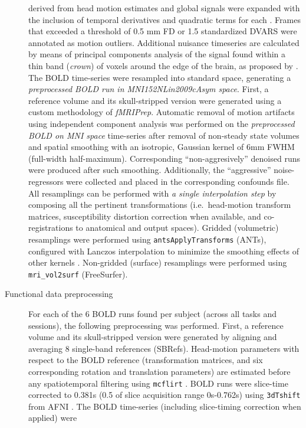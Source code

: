 \documentclass[
]{article}
\begin{document}
\begin{description}
derived from head motion estimates and global signals were expanded with
the inclusion of temporal derivatives and quadratic terms for each
\citep{confounds_satterthwaite_2013}. Frames that exceeded a threshold
of 0.5 mm FD or 1.5 standardized DVARS were annotated as motion
outliers. Additional nuisance timeseries are calculated by means of
principal components analysis of the signal found within a thin band
(\emph{crown}) of voxels around the edge of the brain, as proposed by
\citep{patriat_improved_2017}. The BOLD time-series were resampled into
standard space, generating a \emph{preprocessed BOLD run in
MNI152NLin2009cAsym space}. First, a reference volume and its
skull-stripped version were generated using a custom methodology of
\emph{fMRIPrep}. Automatic removal of motion artifacts using independent
component analysis \citep[ICA-AROMA,][]{aroma} was performed on the
\emph{preprocessed BOLD on MNI space} time-series after removal of
non-steady state volumes and spatial smoothing with an isotropic,
Gaussian kernel of 6mm FWHM (full-width half-maximum). Corresponding
``non-aggresively'' denoised runs were produced after such smoothing.
Additionally, the ``aggressive'' noise-regressors were collected and
placed in the corresponding confounds file. All resamplings can be
performed with \emph{a single interpolation step} by composing all the
pertinent transformations (i.e.~head-motion transform matrices,
susceptibility distortion correction when available, and
co-registrations to anatomical and output spaces). Gridded (volumetric)
resamplings were performed using \texttt{antsApplyTransforms} (ANTs),
configured with Lanczos interpolation to minimize the smoothing effects
of other kernels \citep{lanczos}. Non-gridded (surface) resamplings were
performed using \texttt{mri\_vol2surf} (FreeSurfer).
\item[Functional data preprocessing]
For each of the 6 BOLD runs found per subject (across all tasks and
sessions), the following preprocessing was performed. First, a reference
volume and its skull-stripped version were generated by aligning and
averaging 8 single-band references (SBRefs). Head-motion parameters with
respect to the BOLD reference (transformation matrices, and six
corresponding rotation and translation parameters) are estimated before
any spatiotemporal filtering using \texttt{mcflirt} \citep[FSL
6.0.5.1:57b01774,][]{mcflirt}. BOLD runs were slice-time corrected to
0.381s (0.5 of slice acquisition range 0s-0.762s) using
\texttt{3dTshift} from AFNI \citep[RRID:SCR\_005927]{afni}. The BOLD
time-series (including slice-timing correction when applied) were

\end{description}
\end{document}
